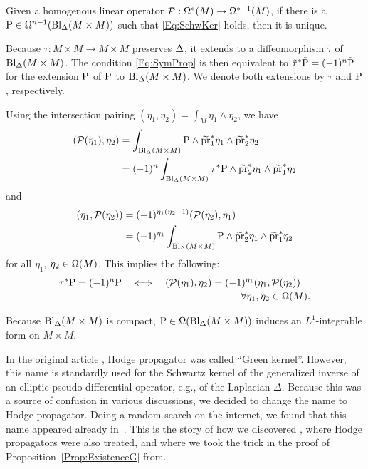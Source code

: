 \documentclass[\MainFolder/Text.tex]{subfiles}
\begin{document}
\begin{Remark}\label{Rem:GKer}
\begin{RemarkList}
\item Given a homogenous linear operator $\mathcal{P}: \Omega^*(M) \rightarrow \Omega^{*-1}(M)$, if there is a $\mathrm{P} \in \Omega^{n-1}(\mathrm{Bl}_{\Delta}(M\times M))$ such that \eqref{Eq:SchwKer} holds, then it is unique.
\item Because $\tau: M\times M \rightarrow M\times M$ preserves $\Delta$, it extends to a diffeomorphism $\tilde{\tau}$ of $\mathrm{Bl}_\Delta(M\times M)$.
The condition \eqref{Eq:SymProp} is then equivalent to $\tilde{\tau}^*\tilde{\mathrm{P}} = (-1)^n \tilde{\mathrm{P}}$ for the extension $\tilde{\mathrm{P}}$ of $\mathrm{P}$ to $\mathrm{Bl}_{\Delta}(M\times M)$.
We denote both extensions by $\tau$ and $\mathrm{P}$, respectively.

\item Using the intersection pairing $(\eta_1,\eta_2) = \int_M \eta_1 \wedge \eta_2$, we have 
\[ \begin{aligned}(\mathcal{P}(\eta_1),\eta_2) &= \int_{\mathrm{Bl}_{\Delta}(M\times M)} \mathrm{P} \wedge \widetilde{\operatorname{\mathrm{pr}}}_1^*\eta_1 \wedge \widetilde{\operatorname{\mathrm{pr}}}_2^*\eta_2 \\ 
&= (-1)^n \int_{\mathrm{Bl}_{\Delta}(M\times M)} \tau^*\mathrm{P} \wedge \widetilde{\operatorname{\mathrm{pr}}}_2^*\eta_1 \wedge \widetilde{\operatorname{\mathrm{pr}}}_1^*\eta_2 \end{aligned}\]
and 
\[ \begin{aligned}(\eta_1, \mathcal{P}(\eta_2)) &= (-1)^{\eta_1(\eta_2 - 1)} (\mathcal{P}(\eta_2),\eta_1) \\ &= (-1)^{\eta_1} \int_{\mathrm{Bl}_\Delta(M\times M)} \mathrm{P} \wedge \widetilde{\operatorname{\mathrm{pr}}}_2^* \eta_1 \wedge \widetilde{\operatorname{\mathrm{pr}}}_1^* \eta_2 \end{aligned}\]
for all $\eta_1$, $\eta_2\in \Omega(M)$.
This implies the following:
\begin{equation}\label{Eq:GSA}
\tau^* \Prpg = (-1)^n \Prpg \quad \Longleftrightarrow \quad \begin{multlined}[t](\Htp(\eta_1),\eta_2) = (-1)^{\eta_1}(\eta_1, \Htp(\eta_2)) \\ \forall \eta_1, \eta_2 \in\DR(M). \end{multlined}
\end{equation}

\item Because $\mathrm{Bl}_\Delta(M\times M)$ is compact, $\mathrm{P}\in \Omega(\mathrm{Bl}_\Delta(M\times M))$ induces an $L^1$-integrable form on $M\times M$.

\item In the original article \cite{Cieliebak2015}, Hodge propagator was called ``Green kernel''.
However, this name is standardly used for the Schwartz kernel of the generalized inverse of an elliptic pseudo-differential operator, e.g., of the Laplacian $\Delta$.
Because this was a source of confusion in various discussions, we decided to change the name to Hodge propagator.
Doing a random search on the internet, we found that this name appeared already in~\cite{Cattaneo2015}.
This is the story of how we discovered \cite{Mnev2009}, where Hodge propagators were also treated, and where we took the trick in the proof of Proposition~\ref{Prop:ExistenceG} from.
\qedhere
\end{RemarkList}
\end{Remark}
\end{document}
